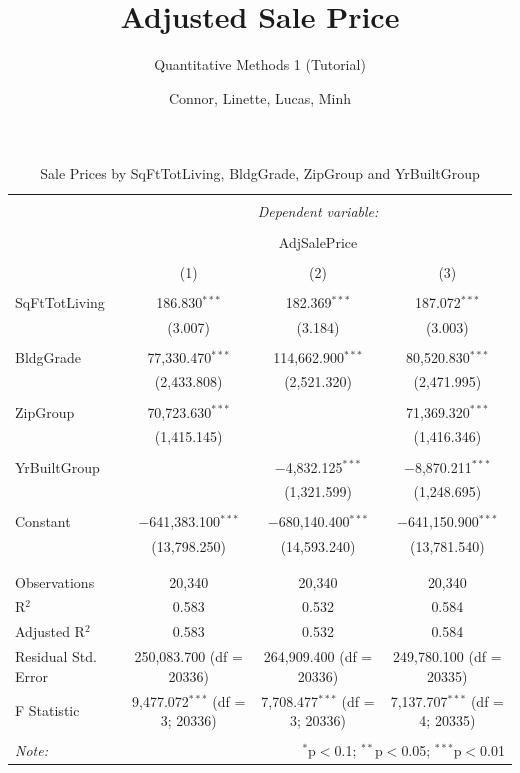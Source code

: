 \documentclass[12pt,a4paper]{article}
\title{Adjusted Sale Price}
\date{Connor, Linette, Lucas, Minh}
\author{Quantitative Methods 1 (Tutorial)}
\begin{document}
	\maketitle

\begin{table}[H] \centering 
	\caption{Sale Prices by SqFtTotLiving, BldgGrade, ZipGroup and YrBuiltGroup} 
	\label{}
	\begin{adjustbox}{width=1\textwidth}
	\begin{tabular}{@{\extracolsep{5pt}}lccc} 
		\\[-1.8ex]\hline 
		\hline \\[-1.8ex] 
		& \multicolumn{3}{c}{\textit{Dependent variable:}} \\ 
		\cline{2-4} 
		\\[-1.8ex] & \multicolumn{3}{c}{AdjSalePrice} \\ 
		\\[-1.8ex] & (1) & (2) & (3)\\ 
		\hline \\[-1.8ex] 
		SqFtTotLiving & 186.830$^{***}$ & 182.369$^{***}$ & 187.072$^{***}$ \\ 
		& (3.007) & (3.184) & (3.003) \\ 
		& & & \\ 
		BldgGrade & 77,330.470$^{***}$ & 114,662.900$^{***}$ & 80,520.830$^{***}$ \\ 
		& (2,433.808) & (2,521.320) & (2,471.995) \\ 
		& & & \\ 
		ZipGroup & 70,723.630$^{***}$ &  & 71,369.320$^{***}$ \\ 
		& (1,415.145) &  & (1,416.346) \\ 
		& & & \\ 
		YrBuiltGroup &  & $-$4,832.125$^{***}$ & $-$8,870.211$^{***}$ \\ 
		&  & (1,321.599) & (1,248.695) \\ 
		& & & \\ 
		Constant & $-$641,383.100$^{***}$ & $-$680,140.400$^{***}$ & $-$641,150.900$^{***}$ \\ 
		& (13,798.250) & (14,593.240) & (13,781.540) \\ 
		& & & \\ 
		\hline \\[-1.8ex] 
		Observations & 20,340 & 20,340 & 20,340 \\ 
		R$^{2}$ & 0.583 & 0.532 & 0.584 \\ 
		Adjusted R$^{2}$ & 0.583 & 0.532 & 0.584 \\ 
		Residual Std. Error & 250,083.700 (df = 20336) & 264,909.400 (df = 20336) & 249,780.100 (df = 20335) \\ 
		F Statistic & 9,477.072$^{***}$ (df = 3; 20336) & 7,708.477$^{***}$ (df = 3; 20336) & 7,137.707$^{***}$ (df = 4; 20335) \\ 
		\hline 
		\hline \\[-1.8ex] 
		\textit{Note:}  & \multicolumn{3}{r}{$^{*}$p$<$0.1; $^{**}$p$<$0.05; $^{***}$p$<$0.01} \\ 
	\end{tabular}
	\end{adjustbox} 
\end{table} 
\end{document}
